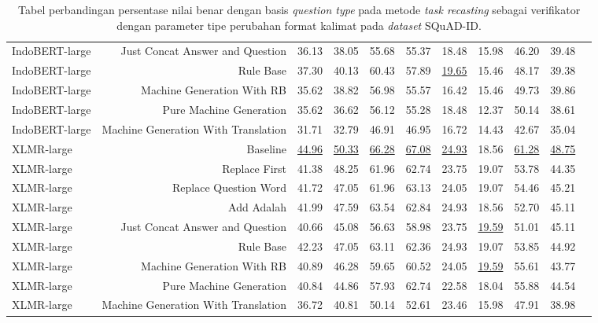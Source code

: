 \begin{table}[H]
\begin{tabular}{lrrrrrrrrrr}
IndoBERT-large &Just Concat Answer and Question &36.13 &38.05 &55.68 &55.37 &18.48 &15.98 &46.20 &39.48 \\
IndoBERT-large &Rule Base &37.30 &40.13 &60.43 &57.89 &\underline{19.65} &15.46 &48.17 &39.38 \\
IndoBERT-large &Machine Generation With RB &35.62 &38.82 &56.98 &55.57 &16.42 &15.46 &49.73 &39.86 \\
IndoBERT-large &Pure Machine Generation &35.62 &36.62 &56.12 &55.28 &18.48 &12.37 &50.14 &38.61 \\
IndoBERT-large &Machine Generation With Translation &31.71 &32.79 &46.91 &46.95 &16.72 &14.43 &42.67 &35.04 \\
\hline
XLMR-large &Baseline &\underline{44.96} &\underline{50.33} &\underline{66.28} &\underline{67.08} &\underline{24.93} &18.56 &\underline{61.28} &\underline{48.75} \\
XLMR-large &Replace First &41.38 &48.25 &61.96 &62.74 &23.75 &19.07 &53.78 &44.35 \\
XLMR-large &Replace Question Word &41.72 &47.05 &61.96 &63.13 &24.05 &19.07 &54.46 &45.21 \\
XLMR-large &Add Adalah &41.99 &47.59 &63.54 &62.84 &24.93 &18.56 &52.70 &45.11 \\
XLMR-large &Just Concat Answer and Question &40.66 &45.08 &56.63 &58.98 &23.75 &\underline{19.59} &51.01 &45.11 \\
XLMR-large &Rule Base &42.23 &47.05 &63.11 &62.36 &24.93 &19.07 &53.85 &44.92 \\
XLMR-large &Machine Generation With RB &40.89 &46.28 &59.65 &60.52 &24.05 &\underline{19.59} &55.61 &43.77 \\
XLMR-large &Pure Machine Generation &40.84 &44.86 &57.93 &62.74 &22.58 &18.04 &55.88 &44.54 \\
XLMR-large &Machine Generation With Translation &36.72 &40.81 &50.14 &52.61 &23.46 &15.98 &47.91 &38.98 \\
\bottomrule
\end{tabular}
\caption{Tabel perbandingan persentase nilai benar dengan basis \emph{question type} pada metode \emph{task recasting} sebagai verifikator dengan parameter tipe perubahan format kalimat pada \emph{dataset} SQuAD-ID.}
\end{table}

